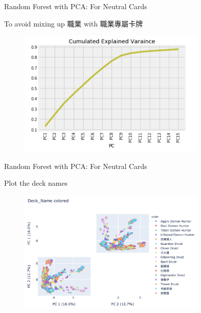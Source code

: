 \documentclass[12pt]{beamer}
\begin{document}
\begin{frame}[fragile]{Random Forest with PCA: For Neutral Cards}

To avoid mixing up 職業 with 職業專屬卡牌

	\begin{figure}
		\begin{center}
			\includegraphics[width=0.8\textwidth]{figure/plot/3c.png}
		\end{center}
	\end{figure}

\end{frame}


\begin{frame}[fragile]{Random Forest with PCA: For Neutral Cards}

Plot the deck names

	\begin{figure}
		\begin{center}
			\includegraphics[width=0.8\textwidth]{figure/plot/3_deckname.png}
		\end{center}
	\end{figure}

\end{frame}
\end{document}
